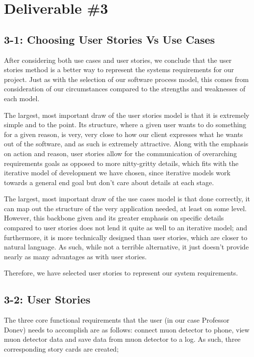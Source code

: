 \documentclass[11pt,a4paper]{article}
\begin{document}
\newpage

\section*{Deliverable \#3}

\subsection*{3-1: Choosing User Stories Vs Use Cases}

After considering both use cases and user stories, we conclude that the user stories method is a better way to represent the systems requirements for our project. Just as with the selection of our software process model, this comes from consideration of our circumstances compared to the strengths and weaknesses of each model.

The largest, most important draw of the user stories model is that it is extremely simple and to the point. Its structure, where a given user wants to do something for a given reason, is very, very close to how our client expresses what he wants out of the software, and as such is extremely attractive. Along with the emphasis on action and reason, user stories allow for the communication of overarching requirements goals as opposed to more nitty-gritty details, which fits with the iterative model of development we have chosen, since iterative models work towards a general end goal but don’t care about details at each stage.

The largest, most important draw of the use cases model is that done correctly, it can map out the structure of the very application needed, at least on some level. However, this backbone given and its greater emphasis on specific details compared to user stories does not lend it quite as well to an iterative model; and furthermore, it is more technically designed than user stories, which are closer to natural language. As such, while not a terrible alternative, it just doesn’t provide nearly as many advantages as with user stories.

Therefore, we have selected user stories to represent our system requirements.


\subsection*{3-2: User Stories}

The three core functional requirements that the user (in our case Professor Donev) needs to accomplish are as follows: connect muon detector to phone, view muon detector data and save data from muon detector to a log. As such, three corresponding story cards are created; 
\end{document}

